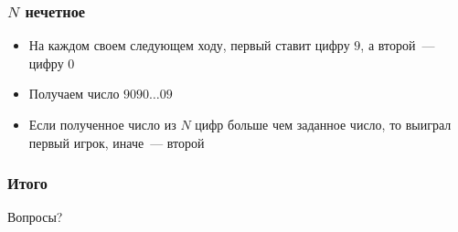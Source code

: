 \begin{frame}
  \frametitle{$N$ нечетное}
  \begin{itemize}
  	\item
    	На каждом своем следующем ходу, первый ставит цифру $9$, а второй~--- цифру $0$
    \item
    	Получаем число $9090 \ldots 09$
   	\item
   		Если полученное число из $N$ цифр больше чем заданное число, то выиграл первый игрок, иначе~--- второй
  \end{itemize}
\end{frame}


\begin{frame}
  \frametitle{Итого}
  Вопросы?
\end{frame}
